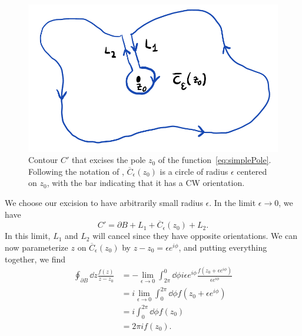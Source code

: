\begin{figure}
\includegraphics[width=\linewidth]{figs/cauchy_integral-cropped.pdf}
\caption{Contour $C'$ that excises the pole $z_0$ of the
function~\eqref{eq:simplePole}. Following the notation of
, $\overline{C}_{\epsilon}(z_0)$ is a circle of
radius $\epsilon$ centered on $z_0$, with the bar indicating that it has a CW
orientation.}
\label{fig:cauchy}
\end{figure}

We choose our excision to have arbitrarily small radius $\epsilon$.
In the limit $\epsilon\to0$, we have
\begin{equation}
  C'=\partial B + L_1 + \overline{C}_{\epsilon}(z_0) + L_2.
\end{equation}
In this limit, $L_1$ and $L_2$ will cancel since they have opposite
orientations.
We can now parameterize $z$ on $\overline{C}_{\epsilon}(z_0)$ 
by $z-z_0=\epsilon e^{i\phi}$, and putting everything together, we find
\begin{equation}\begin{aligned}\label{eq:cauchyn0}
  \oint_{\partial B}\dd{z}\frac{f(z)}{z-z_0}
&=-\lim_{\epsilon\to 0}\int_{2\pi}^0\dd{\phi}
     i\epsilon e^{i\phi}\frac{f(z_0+\epsilon e^{i\phi})}{\epsilon e^{i\phi}}\\
&=i\lim_{\epsilon\to 0}\int_{0}^{2\pi}\dd{\phi}f(z_0+\epsilon e^{i\phi})\\
&=i\int_{0}^{2\pi}\dd{\phi}f(z_0)\\
&=2\pi if(z_0).
\end{aligned}\end{equation}

